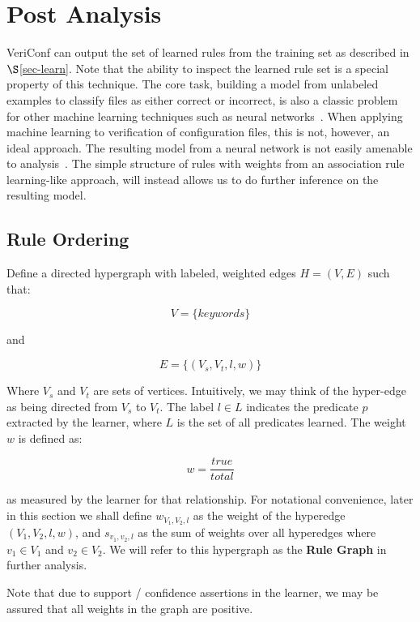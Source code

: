 
\section{Post Analysis}

VeriConf can output the set of learned rules from the training set as described in $\S$\ref{sec-learn}.
Note that the ability to inspect the learned rule set is a special property of this technique.
The core task, building a model from unlabeled examples to classify files as either correct or incorrect, is also a classic problem for other machine learning techniques such as neural networks~\cite{nn1,nn2,nn3}.
When applying machine learning to verification of configuration files, this is not, however, an ideal approach.
The resulting model from a neural network is not easily amenable to analysis~\cite{nnAnalysis1,nnAnalysis2}.
The simple structure of rules with weights from an association rule learning-like approach, will instead allows us to do further inference on the resulting model.

\subsection{Rule Ordering}
\label{sec:ruleorder}

Define a directed hypergraph with labeled, weighted edges $H = (V,E)$ such that:

    $$V = \{ keywords \}$$

and 

    $$E = \{ (V_s, V_t, l, w) \}$$

Where $V_s$ and $V_t$ are sets of vertices. Intuitively, we may think of the
hyper-edge as being directed from $V_s$ to $V_t$. The label $l \in L$ indicates
the predicate $p$ extracted by the learner, where $L$ is the set of all
predicates learned. The weight $w$ is defined as:

    $$w = \frac{true}{total}$$

as measured by the learner for that relationship. For notational
convenience, later in this section
we shall define $w_{V_1, V_2, l}$ as the weight of the
hyperedge $(V_1, V_2, l, w)$, and $s_{v_1, v_2, l}$ as the sum of weights
over all hyperedges where $v_1 \in V_1$ and $v_2 \in V_2$.
We will refer to this hypergraph as the {\bf Rule Graph}
in further analysis.

Note that due to support / confidence assertions in the learner, we
may be assured that all weights in the graph are positive.

